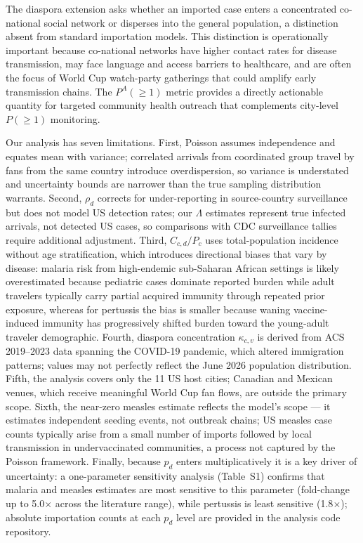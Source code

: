 \documentclass[12pt, a4paper]{article}
\begin{document}
The diaspora extension asks whether an imported case enters a
concentrated co-national social network or disperses into the
general population, a distinction absent from standard importation
models. This distinction is operationally important because
co-national networks have higher contact rates for disease
transmission, may face language and access barriers to healthcare,
and are often the focus of World Cup watch-party gatherings that
could amplify early transmission chains. The $P^A(\geq 1)$ metric
provides a directly actionable quantity for targeted community
health outreach that complements city-level $P(\geq 1)$ monitoring.

Our analysis has seven limitations. First, Poisson assumes independence
and equates mean with variance; correlated arrivals from coordinated
group travel by fans from the same country introduce overdispersion,
so variance is understated and uncertainty bounds are narrower than
the true sampling distribution warrants. Second, $\rho_d$ corrects for
under-reporting in source-country surveillance but does not model
US detection rates; our $\Lambda$ estimates represent true infected
arrivals, not detected US cases, so comparisons with CDC surveillance
tallies require additional adjustment. Third, $C_{c,d}/P_c$ uses
total-population incidence without age stratification, which introduces
directional biases that vary by disease: malaria risk from high-endemic
sub-Saharan African settings is likely overestimated because pediatric
cases dominate reported burden while adult travelers typically carry
partial acquired immunity through repeated prior exposure, whereas for
pertussis the bias is smaller because waning vaccine-induced immunity
has progressively shifted burden toward the young-adult traveler
demographic. Fourth, diaspora concentration $\kappa_{c,v}$ is derived
from ACS 2019--2023 data spanning the COVID-19 pandemic, which altered
immigration patterns; values may not perfectly reflect the June 2026
population distribution. Fifth, the analysis covers only the 11 US
host cities; Canadian and Mexican venues, which receive meaningful
World Cup fan flows, are outside the primary scope. Sixth, the near-zero measles estimate reflects
the model's scope --- it estimates independent seeding events, not
outbreak chains; US measles case counts typically arise from a small
number of imports followed by local transmission in undervaccinated
communities, a process not captured by the Poisson framework.
Finally, because $p_d$ enters multiplicatively it is a key driver
of uncertainty: a one-parameter sensitivity analysis (Table~S1)
confirms that malaria and measles estimates are most sensitive to
this parameter (fold-change up to 5.0$\times$ across the literature
range), while pertussis is least sensitive (1.8$\times$); absolute
importation counts at each $p_d$ level are provided in the
analysis code repository.
\end{document}
